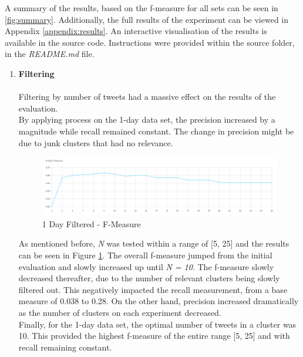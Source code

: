\documentclass[a4paper,portrait,12pt]{article}
\begin{document}
A summary of the results, based on the f-measure for all sets can be seen in \ref{fig:summary}.
Additionally, the full results of the experiment can be viewed in Appendix \ref{appendix:results}.
An interactive visualisation of the results is available in the source code.
Instructions were provided within the source folder, in the \textit{README.md} file.

\begin{enumerate}
	\item \textbf{Filtering}\\
	\\
	      Filtering by number of tweets had a massive effect on the results of the evaluation. \\
	      By applying process on the 1-day data set, the precision increased by a magnitude while recall remained constant.
	      The change in precision might be due to junk clusters that had no relevance.
	      \begin{figure}[h!]
		      \centering
		      \includegraphics[width=\linewidth]{images/1day-filtered-f-measure.png}
		      \caption{1 Day Filtered - F-Measure}
		      \label{fig:1day-filtered-f-measure}
	      \end{figure}

	      As mentioned before, \textit{N} was tested within a range of [5, 25] and the results can be seen in Figure \ref{fig:1day-filtered-f-measure}.
	      The overall f-measure jumped from the initial evaluation and slowly increased up until \textit{N = 10}.
	      The f-measure slowly decreased thereafter, due to the number of relevant clusters being slowly filtered out.
	      This negatively impacted the recall measurement, from a base measure of 0.038 to 0.28.
	      On the other hand, precision increased dramatically as the number of clusters on each experiment decreased.
	      \\
	      Finally, for the 1-day data set, the optimal number of tweets in a cluster was 10.
	      This provided the highest f-measure of the entire range [5, 25] and with recall remaining constant.


\end{enumerate}
\end{document}
